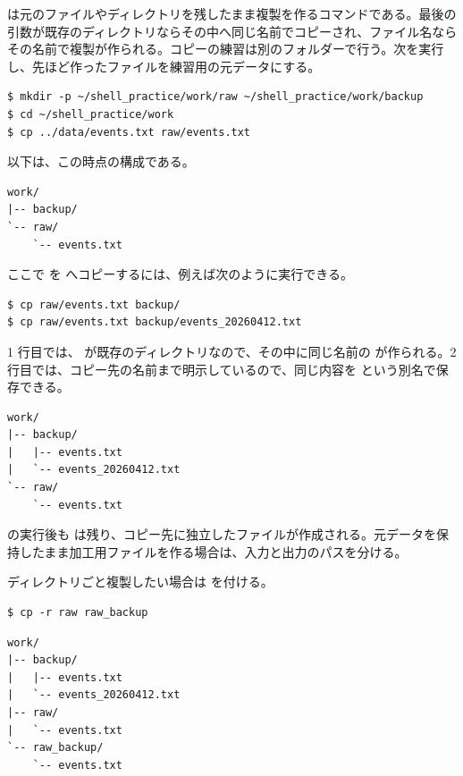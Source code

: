  は元のファイルやディレクトリを残したまま複製を作るコマンドである。最後の引数が既存のディレクトリならその中へ同じ名前でコピーされ、ファイル名ならその名前で複製が作られる。コピーの練習は別のフォルダーで行う。次を実行し、先ほど作ったファイルを練習用の元データにする。

\begin{lstlisting}[numbers=none, xleftmargin=2\zw]
$ mkdir -p ~/shell_practice/work/raw ~/shell_practice/work/backup
$ cd ~/shell_practice/work
$ cp ../data/events.txt raw/events.txt
\end{lstlisting}

以下は、この時点の構成である。

\begin{lstlisting}[numbers=none, xleftmargin=2\zw]
work/
|-- backup/
`-- raw/
    `-- events.txt
\end{lstlisting}

ここで  を  へコピーするには、例えば次のように実行できる。

\begin{lstlisting}[numbers=none, xleftmargin=2\zw]
$ cp raw/events.txt backup/
$ cp raw/events.txt backup/events_20260412.txt
\end{lstlisting}

1 行目では、 が既存のディレクトリなので、その中に同じ名前の  が作られる。2 行目では、コピー先の名前まで明示しているので、同じ内容を  という別名で保存できる。

\begin{lstlisting}[numbers=none, xleftmargin=2\zw]
work/
|-- backup/
|   |-- events.txt
|   `-- events_20260412.txt
`-- raw/
    `-- events.txt
\end{lstlisting}

 の実行後も  は残り、コピー先に独立したファイルが作成される。元データを保持したまま加工用ファイルを作る場合は、入力と出力のパスを分ける。

ディレクトリごと複製したい場合は  を付ける。

\begin{lstlisting}[numbers=none, xleftmargin=2\zw]
$ cp -r raw raw_backup
\end{lstlisting}

\begin{lstlisting}[numbers=none, xleftmargin=2\zw]
work/
|-- backup/
|   |-- events.txt
|   `-- events_20260412.txt
|-- raw/
|   `-- events.txt
`-- raw_backup/
    `-- events.txt
\end{lstlisting}

